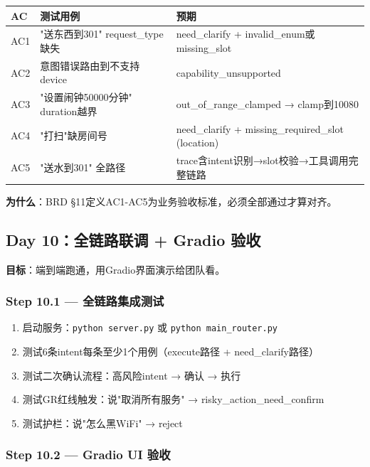 \documentclass[12pt,a4paper]{ctexart}
\begin{document}
\begin{table}[h]
\centering
\begin{tabular}{@{}llp{6cm}@{}}
\toprule
\textbf{AC} & \textbf{测试用例} & \textbf{预期} \\
\midrule
AC1 & "送东西到301" request\_type缺失 & need\_clarify + invalid\_enum或missing\_slot \\
AC2 & 意图错误路由到不支持device & capability\_unsupported \\
AC3 & "设置闹钟50000分钟" duration越界 & out\_of\_range\_clamped → clamp到10080 \\
AC4 & "打扫"缺房间号 & need\_clarify + missing\_required\_slot (location) \\
AC5 & "送水到301" 全路径 & trace含intent识别→slot校验→工具调用完整链路 \\
\bottomrule
\end{tabular}
\end{table}

\textbf{为什么}：BRD §11定义AC1-AC5为业务验收标准，必须全部通过才算对齐。

\subsection{Day 10：全链路联调 + Gradio 验收}

\textbf{目标}：端到端跑通，用Gradio界面演示给团队看。

\subsubsection*{Step 10.1 — 全链路集成测试}

\begin{enumerate}
    \item 启动服务：\texttt{python server.py} 或 \texttt{python main\_router.py}
    \item 测试6条intent每条至少1个用例（execute路径 + need\_clarify路径）
    \item 测试二次确认流程：高风险intent → 确认 → 执行
    \item 测试GR红线触发：说"取消所有服务" → risky\_action\_need\_confirm
    \item 测试护栏：说"怎么黑WiFi" → reject
\end{enumerate}

\subsubsection*{Step 10.2 — Gradio UI 验收}
\end{document}
